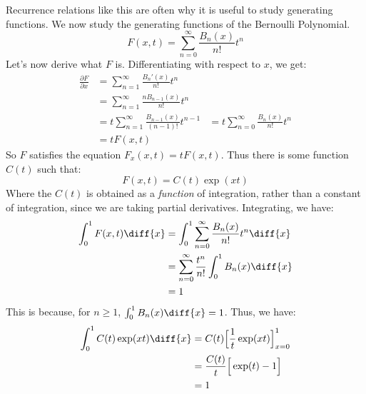 \documentclass[crop=false,class=book,oneside]{standalone}
\begin{document}
            Recurrence relations like this are often why it is
            useful to study generating functions. We now study
            the generating functions of the Bernoulli Polynomial.
            \begin{equation}
                F(x,t)=\sum_{n=0}^{\infty}
                \frac{B_{n}(x)}{n!}t^{n}
            \end{equation}
            Let's now derive what $F$ is. Differentiating with
            respect to $x$, we get:
            \begin{align}
                \frac{\partial{F}}{\partial{x}}
                &=\sum_{n=1}^{\infty}
                \frac{B_{n}'(x)}{n!}t^{n}\\
                &=\sum_{n=1}^{\infty}
                    \frac{nB_{n-1}(x)}{n!}t^{n}\\
                &=t\sum_{n=1}^{\infty}
                    \frac{B_{n-1}(x)}{(n-1)!}t^{n-1}
                &=t\sum_{n=0}^{\infty}
                    \frac{B_{n}(x)}{n!}t^{n}\\
                &=tF(x,t)
            \end{align}
            So $F$ satisfies the equation $F_{x}(x,t)=tF(x,t)$.
            Thus there is some function $C(t)$ such that:
            \begin{equation}
                F(x,t)=C(t)\exp(xt)
            \end{equation}
            Where the $C(t)$ is obtained as a \textit{function}
            of integration, rather than a constant of integration,
            since we are taking partial derivatives. Integrating,
            we have:
            \begin{align}
                \int_{0}^{1}F(x,t)\diff{x}
                &=\int_{0}^{1}\sum_{n=0}^{\infty}
                    \frac{B_{n}(x)}{n!}t^{n}\diff{x}\\
                &=\sum_{n=0}^{\infty}\frac{t^{n}}{n!}
                \int_{0}^{1}B_{n}(x)\diff{x}\\
                &=1
            \end{align}
            This is because, for $n\geq{1}$,
            $\int_{0}^{1}B_{n}(x)\diff{x}=1$. Thus, we have:
            \begin{align}
                \int_{0}^{1}C(t)\exp(xt)\diff{x}&=
                C(t)\Big[\frac{1}{t}\exp(xt)\Big]_{x=0}^{1}\\
                &=\frac{C(t)}{t}\Big[\exp(t)-1\Big]\\
                &=1
            \end{align}
\end{document}
